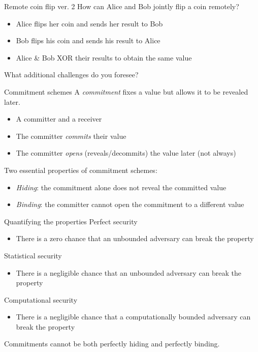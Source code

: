 \begin{frame}{Remote coin flip ver. 2}
  How can Alice and Bob jointly flip a coin remotely?
  \begin{itemize}[<+(1)->]
    \item Alice flips her coin and sends her result to Bob
    \item Bob flips his coin and sends his result to Alice
    \item Alice \& Bob XOR their results to obtain the same value
  \end{itemize}

  \vspace*{1em}

  \pause
  What additional challenges do you foresee?
\end{frame}

\begin{frame}{Commitment schemes}
  A \emph{commitment} fixes a value but allows it to be revealed later.
  \begin{itemize}[<+(1)->]
    \item A committer and a receiver
    \item The committer \emph{commits} their value
    \item The committer \emph{opens} (reveals/decommits) the value later (not always)
  \end{itemize}

  \vspace*{1em}

  \pause
  Two essential properties of commitment schemes:
  \begin{itemize}[<+(1)->]
    \item \emph{Hiding}: the commitment alone does not reveal the committed value
    \item \emph{Binding}: the committer cannot open the commitment to a different value
  \end{itemize}
\end{frame}

\begin{frame}{Quantifying the properties}
  Perfect security
  \begin{itemize}
    \item There is a zero chance that an unbounded adversary can break the property
  \end{itemize}

  \pause
  Statistical security
  \begin{itemize}
    \item There is a negligible chance that an unbounded adversary can break the property
  \end{itemize}

  \pause
  Computational security
  \begin{itemize}
    \item There is a negligible chance that a computationally bounded adversary can break the property
  \end{itemize}

  \pause
  Commitments cannot be both perfectly hiding and perfectly binding.
\end{frame}

